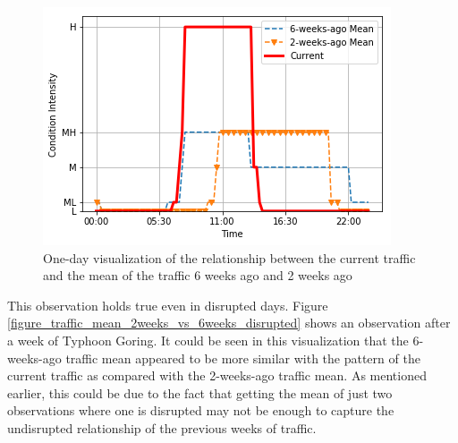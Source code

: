 \begin{figure}
  \includegraphics[width=\linewidth]{figures/figure_traffic_mean_2weeks_vs_6weeks.png}
  \caption{One-day visualization of the relationship between the current traffic and the mean of the traffic 6 weeks ago and 2 weeks ago}
  \label{figure_traffic_mean_2weeks_vs_6weeks}
\end{figure}





This observation holds true even in disrupted days. Figure \ref{figure_traffic_mean_2weeks_vs_6weeks_disrupted} shows an observation after a week of Typhoon Goring. It could be seen in this visualization that the 6-weeks-ago traffic mean appeared to be more similar with the pattern of the current traffic as compared with the 2-weeks-ago traffic mean. As mentioned earlier, this could be due to the fact that getting the mean of just two observations where one is disrupted may not be enough to capture the undisrupted relationship of the previous weeks of traffic.






